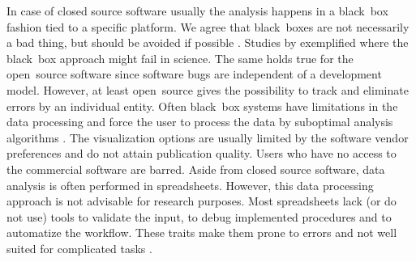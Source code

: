 In case of closed source software usually the analysis happens in a black~box 
fashion tied to a specific platform. We agree that black~boxes are not 
necessarily a bad thing, but should be avoided if possible 
\citep{roediger_RJ_2013, Spiess_2014}. Studies by \citet{mccullough_2008, 
Almiron_2010, Duran_2014} exemplified where the black~box approach might fail 
in 
science. The same holds true for the open~source software since software 
bugs are independent of a development model. However, at least open~source 
gives 
the possibility to track and eliminate  errors by an individual entity. Often 
black~box systems have limitations in the data processing and force the user to 
process the data by suboptimal analysis algorithms \citep{ruijter_2013}. The 
visualization options are usually limited by the software vendor preferences 
and 
do not attain publication quality. Users who have no access to the commercial 
software are barred. Aside from closed source software, data 
analysis is often performed in spreadsheets. However, this data processing 
approach is not 
advisable for research purposes. Most spreadsheets  lack (or do not use) 
tools to validate the input, to debug implemented procedures and to automatize 
the workflow. These traits make them prone to errors and not well suited for 
complicated tasks \citep{mccullough_2008, burns_2014}.

